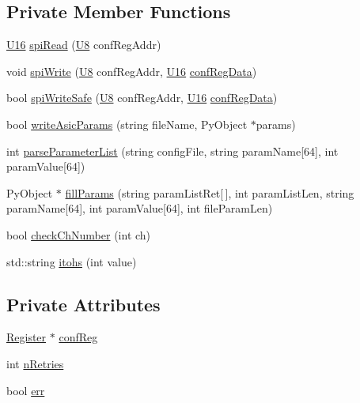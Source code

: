 \subsection*{Private Member Functions}
\begin{DoxyCompactItemize}
\item 
\hyperlink{ICECALv3_8h_adf928e51a60dba0df29d615401cc55a8}{U16} \hyperlink{classICECALv3_aaabb9543482c4141fa89b4b8410164e0}{spi\+Read} (\hyperlink{ICECALv3_8h_a3cb25ca6f51f003950f9625ff05536fc}{U8} conf\+Reg\+Addr)
\item 
void \hyperlink{classICECALv3_aef00f02801dea4bda2093c930501dcdd}{spi\+Write} (\hyperlink{ICECALv3_8h_a3cb25ca6f51f003950f9625ff05536fc}{U8} conf\+Reg\+Addr, \hyperlink{ICECALv3_8h_adf928e51a60dba0df29d615401cc55a8}{U16} \hyperlink{structconfRegData}{conf\+Reg\+Data})
\item 
bool \hyperlink{classICECALv3_aa0b8358ea0be8e47a8aded5e1551787f}{spi\+Write\+Safe} (\hyperlink{ICECALv3_8h_a3cb25ca6f51f003950f9625ff05536fc}{U8} conf\+Reg\+Addr, \hyperlink{ICECALv3_8h_adf928e51a60dba0df29d615401cc55a8}{U16} \hyperlink{structconfRegData}{conf\+Reg\+Data})
\item 
bool \hyperlink{classICECALv3_a9d7c33e6d113e7f721dc848d28ab44d8}{write\+Asic\+Params} (string file\+Name, Py\+Object $\ast$params)
\item 
int \hyperlink{classICECALv3_a313e8166af1ce26b4026f883ad900fb9}{parse\+Parameter\+List} (string config\+File, string param\+Name\mbox{[}64\mbox{]}, int param\+Value\mbox{[}64\mbox{]})
\item 
Py\+Object $\ast$ \hyperlink{classICECALv3_ac006abc42a048308427f6801d783a407}{fill\+Params} (string param\+List\+Ret\mbox{[}$\,$\mbox{]}, int param\+List\+Len, string param\+Name\mbox{[}64\mbox{]}, int param\+Value\mbox{[}64\mbox{]}, int file\+Param\+Len)
\item 
bool \hyperlink{classICECALv3_a8753a74558f988b346a3fe350c5bbad4}{check\+Ch\+Number} (int ch)
\item 
std\+::string \hyperlink{classICECALv3_a04b02e583f191bfce34d05132cd23834}{itohs} (int value)
\end{DoxyCompactItemize}
\subsection*{Private Attributes}
\begin{DoxyCompactItemize}
\item 
\hyperlink{classRegister}{Register} $\ast$ \hyperlink{classICECALv3_a6e8b6c03f5b0f1d8281bf8a0fa46064f}{conf\+Reg}
\item 
int \hyperlink{classICECALv3_ae877ce34b3a4d6c368cc6409ac9614fa}{n\+Retries}
\item 
bool \hyperlink{classICECALv3_ad8989925ee5b3ff322d863ce6aaff0bd}{err}
\end{DoxyCompactItemize}


